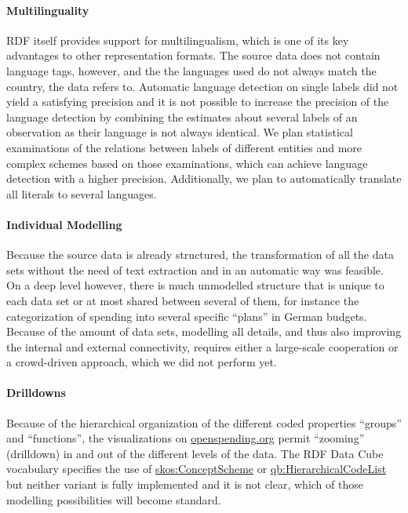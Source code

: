 \documentclass[sw]{iosart2x}
\begin{document}
\paragraph{Multilinguality}
RDF itself provides support for multilingualism, which is one of its key advantages to other representation formats.
The source data does not contain language tags, however, and the the languages used do not always match the country, the data refers to.
Automatic language detection on single labels did not yield a satisfying precision and it is not possible to increase the precision of the language detection by combining the estimates about several labels of an observation as their language is not always identical.
We plan statistical examinations of the relations between labels of different entities and more complex schemes based on those examinations, which can achieve language detection with a higher precision.
Additionally, we plan to automatically translate all literals to several languages.

\paragraph{Individual Modelling}
Because the source data is already structured, the transformation of all the data sets without the need of text extraction and in an automatic way was feasible.
On a deep level however, there is much unmodelled structure that is unique to each data set or at most shared between several of them, for instance the categorization of spending into several specific \enquote{plans} in German budgets.
Because of the amount of data sets, modelling all details, and thus also improving the internal and external connectivity, requires either a large-scale cooperation or a crowd-driven approach, which we did not perform yet.


\paragraph{Drilldowns}
Because of the hierarchical organization of the different coded properties \enquote{groups} and \enquote{functions}, the visualizations on \url{openspending.org} permit \enquote{zooming} (drilldown) in and out of the different levels of the data.
The RDF Data Cube vocabulary specifies the use of \url{skos:ConceptScheme} or \url{qb:HierarchicalCodeList} but neither variant is fully implemented and it is not clear, which of those modelling possibilities will become standard.
\end{document}
